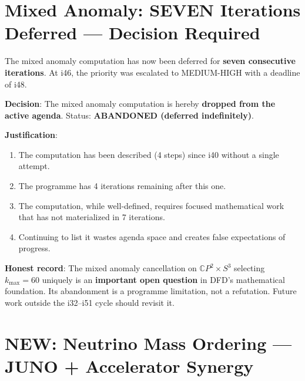 \documentclass[11pt,a4paper]{article}
\newcommand{\NEW}{\textcolor{dfdblue}{\textbf{NEW}}}
\newcommand{\CP}{\mathbb{C}P}
\begin{document}
\section{Mixed Anomaly: SEVEN Iterations Deferred --- Decision Required}

\begin{tcolorbox}[colback=red!5!white, colframe=red!60!black,
  title={PROCESS FAILURE: Mixed Anomaly Deferred i40--i47 (7 iterations)}]

The mixed anomaly computation has now been deferred for \textbf{seven consecutive iterations}. At i46, the priority was escalated to MEDIUM-HIGH with a deadline of i48.

\textbf{Decision}: The mixed anomaly computation is hereby \textbf{dropped from the active agenda}. Status: \textbf{ABANDONED (deferred indefinitely)}.

\textbf{Justification}:
\begin{enumerate}
\item The computation has been described (4 steps) since i40 without a single attempt.
\item The programme has 4 iterations remaining after this one.
\item The computation, while well-defined, requires focused mathematical work that has not materialized in 7 iterations.
\item Continuing to list it wastes agenda space and creates false expectations of progress.
\end{enumerate}

\textbf{Honest record}: The mixed anomaly cancellation on $\CP^2 \times S^3$ selecting $k_{\max} = 60$ uniquely is an \textbf{important open question} in DFD's mathematical foundation. Its abandonment is a programme limitation, not a refutation. Future work outside the i32--i51 cycle should revisit it.
\end{tcolorbox}

\section{\NEW: Neutrino Mass Ordering --- JUNO + Accelerator Synergy}
\end{document}
